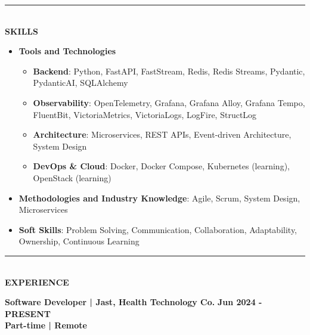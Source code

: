 \documentclass[10pt, dvipsnames, svgnames, x11names]{article}
\begin{document}
\noindent\textcolor{DarkBlue}{\rule{\textwidth}{0.05mm}} \vspace{-1mm} \\
{\LARGE \textbf{SKILLS}}

\begin{itemize}[nosep]
\item \textbf{Tools and Technologies}
\begin{itemize}[nosep]
\item \textbf{Backend}: Python, FastAPI, FastStream, Redis, Redis Streams, Pydantic, PydanticAI, SQLAlchemy

\item \textbf{Observability}: OpenTelemetry, Grafana, Grafana Alloy, Grafana Tempo, FluentBit, VictoriaMetrics, VictoriaLogs,  LogFire, StructLog

\item \textbf{Architecture}: Microservices, REST APIs, Event-driven Architecture, System Design

\item \textbf{DevOps \& Cloud}: Docker, Docker Compose, Kubernetes (learning), OpenStack (learning)
\end{itemize}

\item \textbf{Methodologies and Industry Knowledge}: Agile, Scrum, System Design, Microservices
\item \textbf{Soft Skills}: Problem Solving, Communication, Collaboration, Adaptability, Ownership, Continuous Learning
\end{itemize}

\noindent\textcolor{DarkBlue}{\rule{\textwidth}{0.05mm}} \vspace{-1mm} \\
{\LARGE \textbf{EXPERIENCE}}

\noindent \textbf{Software Developer | Jast, Health Technology Co.} \hfill \textbf{Jun 2024 - PRESENT} \\
\noindent \textbf{Part-time | Remote}
\end{document}
